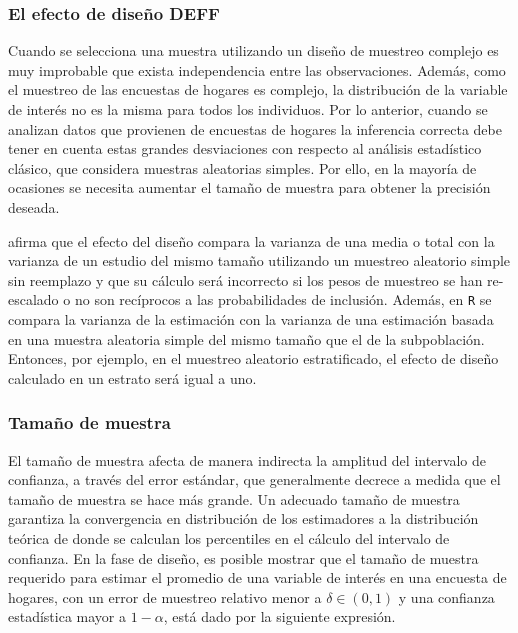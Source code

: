 \documentclass[
  10pt,
  spanish,
]{book}
\begin{document}
\hypertarget{el-efecto-de-diseuxf1o-deff}{%
\subsubsection*{El efecto de diseño DEFF}\label{el-efecto-de-diseuxf1o-deff}}

Cuando se selecciona una muestra utilizando un diseño de muestreo complejo es muy improbable que exista independencia entre las observaciones. Además, como el muestreo de las encuestas de hogares es complejo, la distribución de la variable de interés no es la misma para todos los individuos. Por lo anterior, cuando se analizan datos que provienen de encuestas de hogares la inferencia correcta debe tener en cuenta estas grandes desviaciones con respecto al análisis estadístico clásico, que considera muestras aleatorias simples. Por ello, en la mayoría de ocasiones se necesita aumentar el tamaño de muestra para obtener la precisión deseada.

\citet{Lumley_2010} afirma que el efecto del diseño compara la varianza de una media o total con la varianza de un estudio del mismo tamaño utilizando un muestreo aleatorio simple sin reemplazo y que su cálculo será incorrecto si los pesos de muestreo se han re-escalado o no son recíprocos a las probabilidades de inclusión. Además, en \texttt{R} se compara la varianza de la estimación con la varianza de una estimación basada en una muestra aleatoria simple del mismo tamaño que el de la subpoblación. Entonces, por ejemplo, en el muestreo aleatorio estratificado, el efecto de diseño calculado en un estrato será igual a uno.

\hypertarget{tamauxf1o-de-muestra}{%
\subsubsection*{Tamaño de muestra}\label{tamauxf1o-de-muestra}}

El tamaño de muestra afecta de manera indirecta la amplitud del intervalo de confianza, a través del error estándar, que generalmente decrece a medida que el tamaño de muestra se hace más grande. Un adecuado tamaño de muestra garantiza la convergencia en distribución de los estimadores a la distribución teórica de donde se calculan los percentiles en el cálculo del intervalo de confianza. En la fase de diseño, es posible mostrar que el tamaño de muestra requerido para estimar el promedio de una variable de interés en una encuesta de hogares, con un error de muestreo relativo menor a \(\delta \in (0,1)\) y una confianza estadística mayor a \(1-\alpha\), está dado por la siguiente expresión.
\end{document}
